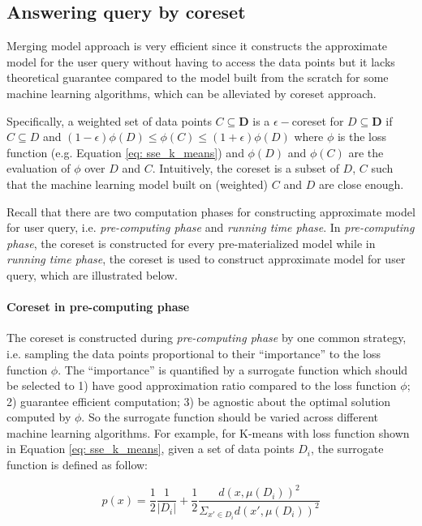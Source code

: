 \subsection{Answering query by coreset}
Merging model approach is very efficient since it constructs the approximate model for the user query without having to access the data points but it lacks theoretical guarantee compared to the model built from the scratch for some machine learning algorithms, which can be alleviated by coreset approach.

Specifically, a weighted set of data points $C \subseteq \textbf{D}$ is a $\epsilon-$coreset for $D \subseteq \textbf{D}$ if $C \subseteq D$ and $(1-\epsilon)\phi(D) \leq \phi(C) \leq (1+\epsilon)\phi(D)$ where $\phi$ is the loss function (e.g. Equation \ref{eq: sse_k_means}) and $\phi(D)$ and $\phi(C)$ are the evaluation of $\phi$ over $D$ and $C$. Intuitively, the coreset is a subset of $D$, $C$ such that the machine learning model built on (weighted) $C$ and $D$ are close enough.

Recall that there are two computation phases for constructing approximate model for user query, i.e. {\em pre-computing phase} and {\em running time phase}. In {\em pre-computing phase}, the coreset is constructed for every pre-materialized model while in {\em running time phase}, the coreset is used to construct approximate model for user query, which are illustrated below.

\paragraph{Coreset in pre-computing phase} The coreset is constructed during {\em pre-computing phase} by one common strategy, i.e. sampling the data points proportional to their ``importance'' to the loss function $\phi$. The ``importance'' is quantified by a surrogate function which should be selected to 1) have good approximation ratio compared to the loss function $\phi$; 2) guarantee efficient computation; 3) be  agnostic about the optimal solution computed by $\phi$. So the surrogate function should be varied across different machine learning algorithms. For example, for K-means with loss function shown in Equation \ref{eq: sse_k_means}, given a set of data points $D_i$, the surrogate function is defined as follow:

\begin{equation}\label{eq: surrogate_function}
    p(x) = \frac{1}{2}\frac{1}{|D_i|} + \frac{1}{2}\frac{d(x, \mu(D_i))^2}{\Sigma_{x'\in D_i}d(x', \mu(D_i))^2}
\end{equation}

